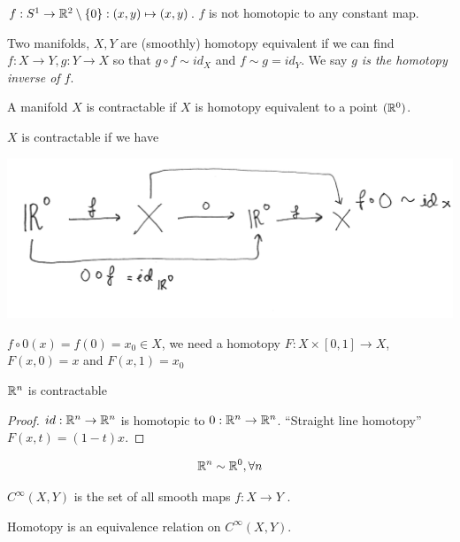 \begin{example}
  $f:S^1\to \mathbb{R}^2\setminus\{0\}: (x,y)\mapsto (x,y)$.
  \newline $f$ is not homotopic to any constant map.
\end{example}
\begin{definition}
  Two manifolds, $X,Y$ are (smoothly) homotopy equivalent if we can find $f: X\to Y, g:Y \to X$ so that $g\circ f \sim id_X$ and $f \sim g = id_Y$. We say \emph{$g$ is the homotopy inverse of $f$}.
\end{definition}
\begin{definition}
  A manifold $X$ is contractable if $X$ is homotopy equivalent to a point $(\mathbb{R}^0)$.
\end{definition}

$X$ is contractable if we have
\begin{center}
    \includegraphics[width=0.40\paperwidth]{difftop/week06/contraction}
\end{center}
$f \circ 0(x)= f(0)=x_0 \in X$, we need a homotopy
\newline $F: X\times[0,1] \to X$, $F(x,0)=x$ and $F(x,1)=x_0$

\begin{proposition}
  $\mathbb{R}^n$ is contractable
\end{proposition}
\begin{proof}
  $id: \mathbb{R}^n \to \mathbb{R}^n$ is homotopic to $0: \mathbb{R}^n \to \mathbb{R}^n$. ``Straight line homotopy'' $F(x,t)=(1-t)x$.
    \qedhere
\end{proof}
$$\mathbb{R}^n \sim \mathbb{R}^0 , \forall n$$

\begin{notation}
  $C^{\infty}(X,Y)$ is the set of all smooth maps $f: X \to Y$ .
\end{notation}
\begin{remark}
  Homotopy is an equivalence relation on $C^{\infty}(X,Y)$.
\end{remark}

